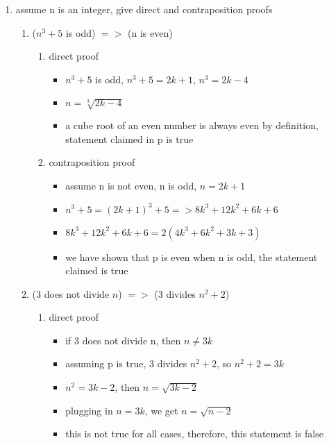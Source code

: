 \documentclass[12pt]{article}
\begin{document}
    \begin{enumerate}
        \item assume n is an integer, give direct and contraposition proofs
        \begin{enumerate}
            \item ($n^3 + 5$ is odd) $=>$ (n is even)
            \begin{enumerate}
                \item direct proof
                \begin{itemize}
                    \item $n^3 + 5$ is odd, $n^3 + 5 = 2k + 1$, $n^3 = 2k -4$
                    \item $n = \sqrt[3]{2k-4}$
                    \item a cube root of an even number is always even by definition, statement claimed in p is true
                \end{itemize}
                \item contraposition proof
                \begin{itemize}
                    \item assume n is not even, n is odd, $n = 2k + 1$
                    \item $n^3 + 5 = (2k+1)^3 + 5 => 8k^3 + 12k^2 + 6k + 6$
                    \item $8k^3 + 12k^2 + 6k + 6 = 2(4k^3 + 6k^2 + 3k + 3)$
                    \item we have shown that p is even when n is odd, the statement claimed is true 
                \end{itemize}
            \end{enumerate}
            \item (3 does not divide $n$) $=>$ (3 divides $n^2 + 2$)
            \begin{enumerate}
                \item direct proof
                \begin{itemize}
                    \item if 3 does not divide n, then $n \neq 3k$
                    \item assuming p is true, 3 divides $n^2 + 2$, so $n^2 + 2 = 3k$
                    \item $n^2 = 3k-2$, then $n = \sqrt{3k-2}$
                    \item plugging in $n = 3k$, we get $n = \sqrt{n-2}$
                    \item this is not true for all cases, therefore, this statement is false

\end{itemize}
\end{enumerate}
\end{enumerate}
\end{enumerate}
\end{document}
